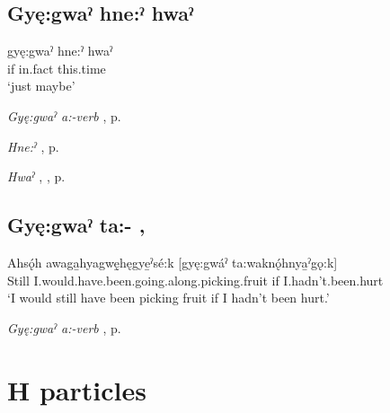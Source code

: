 \subsection*{\textbf{Gyę:gwaˀ hne:ˀ hwaˀ} } \label{p:[gyę:gwaˀ hne:ˀ hwaˀ]}

\ea
\label{ex:gpar143}
\gll gyę:gwaˀ hne:ˀ hwaˀ\\
if in.fact this.time\\
\glt ‘just maybe’
\z

\begin{CayugaRelated}
\item \textit{Gyę:gwaˀ a:-verb} , p. \pageref{p:[gyę:gwaˀ]}\\
\item \textit{Hne:ˀ} , p. \pageref{p:[hne:ˀ] ‘in fact’}\\
\item \textit{Hwaˀ} , , p. \pageref{p:[hwaˀ]}
\end{CayugaRelated}


\subsection*{\textbf{Gyę:gwaˀ ta:-} , } \label{p:[gyę:gwaˀ ta:- ]}

\ea
\label{ex:gpar144}
\gll Ahsǫ́h awaga̱hyagwę̱hęgye̱ˀsé:k [gyę:gwáˀ ta:waknǫ́hnya̱ˀgǫ:k]\\
Still I.would.have.been.going.along.picking.fruit if I.hadn’t.been.hurt\\
\glt ‘I would still have been picking fruit if I hadn’t been hurt.’
\z

\begin{CayugaRelated}
\item \textit{Gyę:gwaˀ a:-verb} , p. \pageref{p:[gyę:gwaˀ]}
\end{CayugaRelated}

\section{H particles}

